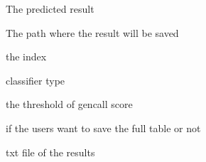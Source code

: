 \documentclass[a4paper]{book}
\begin{document}
%
\begin{Arguments}
\begin{ldescription}
\item[\code{result}] The predicted result

\item[\code{filename}] The path where the result will be saved

\item[\code{header}] the index

\item[\code{clftype}] classifier type

\item[\code{threshold}] the threshold of gencall score

\item[\code{all}] if the users want to save the full table or not

\end{ldescription}
\end{Arguments}
%
\begin{Value}
txt file of the results
\end{Value}
%
\end{document}
